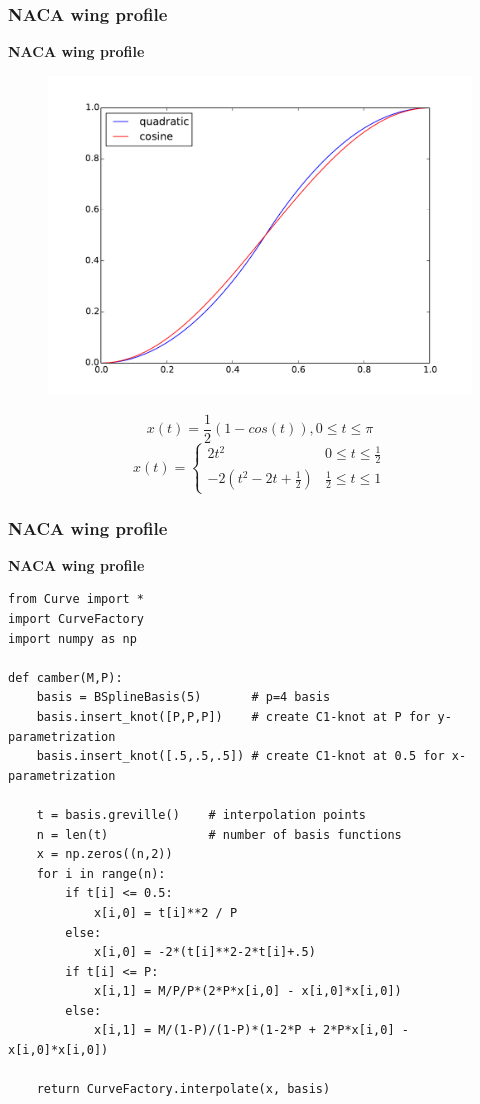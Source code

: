 \documentclass{beamer}
\theoremstyle{plain}
\theoremstyle{definition}
\begin{document}
\begin{frame}
\frametitle{NACA wing profile}
\textbf{NACA wing profile}

\begin{figure}[h]
    \centering
    \includegraphics[width=0.5\linewidth]{parametrization}
\end{figure}

\begin{equation*}
    x(t) = \frac{1}{2}\left(1-cos(t)\right), 0\leq t\leq \pi
\end{equation*}
\begin{equation*}
    x(t) = \left\{
        \begin{array}{ll}
             2t^2                  & 0 \leq t \leq \frac{1}{2} \\
            -2(t^2-2t+\frac{1}{2}) & \frac{1}{2} \leq t \leq 1
        \end{array}
    \right.
\end{equation*}

\end{frame}


\begin{frame}[fragile]
\frametitle{NACA wing profile}
\textbf{NACA wing profile}

\begin{listing}[H]
    \tiny
    \begin{verbatim}
from Curve import *
import CurveFactory
import numpy as np

def camber(M,P):
    basis = BSplineBasis(5)       # p=4 basis
    basis.insert_knot([P,P,P])    # create C1-knot at P for y-parametrization
    basis.insert_knot([.5,.5,.5]) # create C1-knot at 0.5 for x-parametrization

    t = basis.greville()    # interpolation points
    n = len(t)              # number of basis functions
    x = np.zeros((n,2))
    for i in range(n):
        if t[i] <= 0.5:
            x[i,0] = t[i]**2 / P
        else:
            x[i,0] = -2*(t[i]**2-2*t[i]+.5)
        if t[i] <= P:
            x[i,1] = M/P/P*(2*P*x[i,0] - x[i,0]*x[i,0])
        else:
            x[i,1] = M/(1-P)/(1-P)*(1-2*P + 2*P*x[i,0] - x[i,0]*x[i,0])

    return CurveFactory.interpolate(x, basis)
    \end{verbatim}
\end{listing}

\end{frame}
\end{document}
